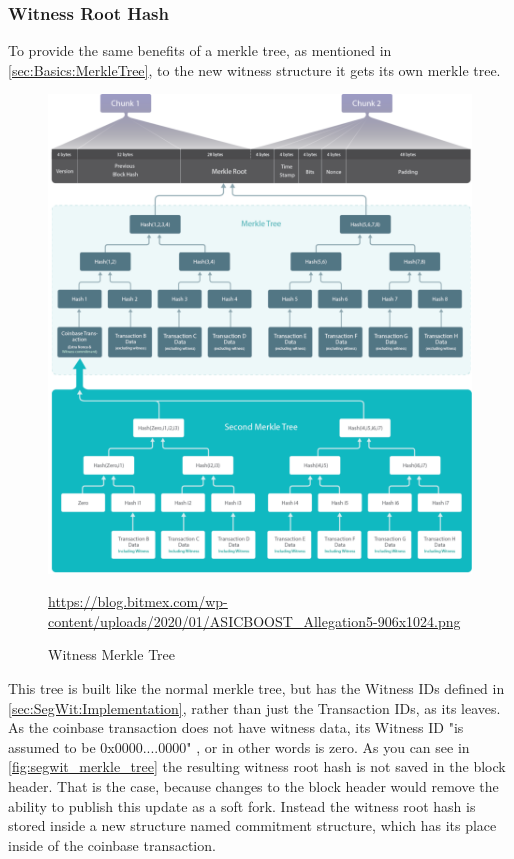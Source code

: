 \subsubsection{Witness Root Hash}
\label{subsec:SegWit:Implementation:WitnessRootHash}
To provide the same benefits of a merkle tree, as mentioned in \autoref{sec:Basics:MerkleTree}, to the new witness structure it gets its own merkle tree.
\begin{figure}[!ht]
    \centering
    \includegraphics[width=(\textwidth * 2 / 3 )]{Ausarbeitung/images/SegWitMerkleTree.png}
    \caption[Witness Merkle Tree]{Witness Merkle Tree}
    \small \url{https://blog.bitmex.com/wp-content/uploads/2020/01/ASICBOOST_Allegation5-906x1024.png} 
    \label{fig:segwit_merkle_tree}
\end{figure}
This tree is built like the normal merkle tree, but has the Witness IDs defined in \autoref{sec:SegWit:Implementation}, rather than just the Transaction IDs, as its leaves. As the coinbase transaction does not have witness data, its Witness ID "is assumed to be 0x0000....0000" \cite{bip-141}, or in other words is zero.
As you can see in \autoref{fig:segwit_merkle_tree} the resulting witness root hash is not saved in the block header. That is the case, because changes to the block header would remove the ability to publish this update as a soft fork. Instead the witness root hash is stored inside a new structure named commitment structure, which has its place inside of the coinbase transaction.


